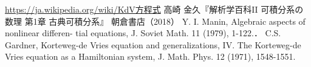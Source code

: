 \documentclass[dvipdfmx,12pt,a4paper,uplatex]{jsarticle}
\theoremstyle{plain}
\theoremstyle{definition}
\begin{document}
\begin{thebibliography}{数字}
  \href{https://ja.wikipedia.org/wiki/KdV方程式}{https://ja.wikipedia.org/wiki/KdV方程式} 
   高崎 金久『解析学百科II 可積分系の数理 第1章 古典可積分系』 朝倉書店（2018）
  Y. I. Manin, Algebraic aspects of nonlinear differen- tial equations, J. Soviet Math. 11 (1979), 1-122.．
   C.S. Gardner, Korteweg-de Vries equation and generalizations, IV. The Korteweg-de Vries equation as a Hamiltonian system, J. Math. Phys. 12 (1971), 1548-1551.  
\end{thebibliography}
\end{document}

